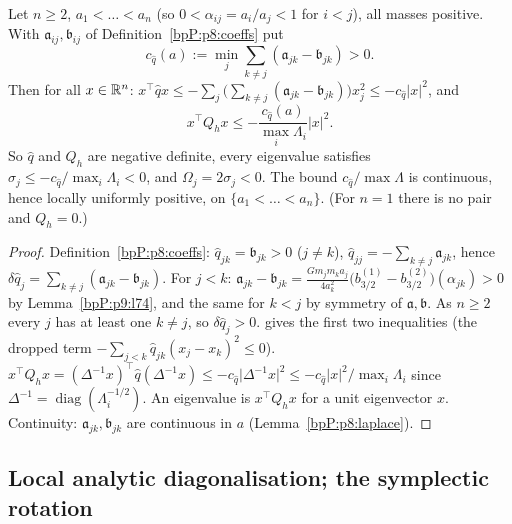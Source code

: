 \begin{proposition}\label{bpP:p9:definite}
Let $n\ge2$, $a_1<\dots<a_n$ (so $0<\alpha_{ij}=a_i/a_j<1$ for $i<j$), all masses positive. With $\mathfrak a_{ij},\mathfrak b_{ij}$ of Definition~\ref{bpP:p8:coeffs} put
\[c_{\hat q}(a):=\min_j\sum_{k\ne j}(\mathfrak a_{jk}-\mathfrak b_{jk})>0.\]
Then for all $x\in\mathbb{R}^n$: $x^\top\hat qx\le-\sum_{j}\big(\sum_{k\ne j}(\mathfrak a_{jk}-\mathfrak b_{jk})\big)x_j^2\le-c_{\hat q}\lvert x\rvert^2$, and
\[x^\top Q_hx\le-\frac{c_{\hat q}(a)}{\max_i\Lambda_i}\lvert x\rvert^2 .\]
So $\hat q$ and $Q_h$ are negative definite, every eigenvalue satisfies $\sigma_j\le-c_{\hat q}/\max_i\Lambda_i<0$, and $\Omega_j=2\sigma_j<0$. The bound $c_{\hat q}/\max\Lambda$ is continuous, hence locally uniformly positive, on $\{a_1<\dots<a_n\}$. (For $n=1$ there is no pair and $Q_h=0$.)
\end{proposition}
\begin{proof}
\label{stepP:p9:p73-dom} Definition~\ref{bpP:p8:coeffs}: $\hat q_{jk}=\mathfrak b_{jk}>0$ ($j\ne k$), $\hat q_{jj}=-\sum_{k\ne j}\mathfrak a_{jk}$, hence $\delta\hat q_j=\sum_{k\ne j}(\mathfrak a_{jk}-\mathfrak b_{jk})$. For $j<k$: $\mathfrak a_{jk}-\mathfrak b_{jk}=\frac{Gm_jm_ka_j}{4a_k^2}\big(b_{3/2}^{(1)}-b_{3/2}^{(2)}\big)(\alpha_{jk})>0$ by Lemma~\ref{bpP:p9:l74}, and the same for $k<j$ by symmetry of $\mathfrak a,\mathfrak b$. As $n\ge2$ every $j$ has at least one $k\ne j$, so $\delta\hat q_j>0$.
\label{stepP:p9:p73-had} gives the first two inequalities (the dropped term $-\sum_{j<k}\hat q_{jk}(x_j-x_k)^2\le0$).
\label{stepP:p9:p73-cong} $x^\top Q_hx=(\Delta^{-1}x)^\top\hat q(\Delta^{-1}x)\le-c_{\hat q}\lvert\Delta^{-1}x\rvert^2\le-c_{\hat q}\lvert x\rvert^2/\max_i\Lambda_i$ since $\Delta^{-1}=\operatorname{diag}(\Lambda_i^{-1/2})$. An eigenvalue is $x^\top Q_hx$ for a unit eigenvector $x$. Continuity: $\mathfrak a_{jk},\mathfrak b_{jk}$ are continuous in $a$ (Lemma~\ref{bpP:p8:laplace}).
\end{proof}

\subsection{Local analytic diagonalisation; the symplectic rotation}\label{bpP:p9:sec-diag}

